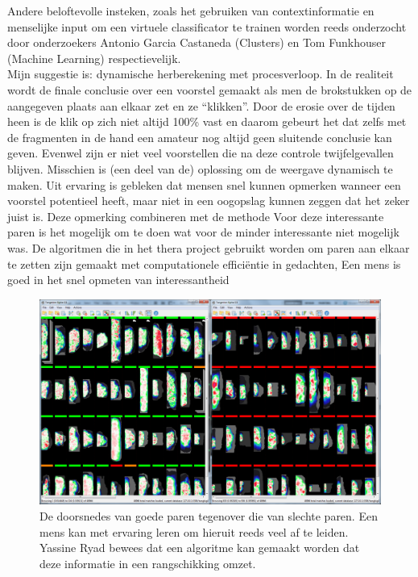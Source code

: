 Andere beloftevolle insteken, zoals het gebruiken van contextinformatie en menselijke input om een virtuele classificator te trainen worden reeds onderzocht door onderzoekers Antonio Garcia Castaneda (Clusters) en Tom Funkhouser (Machine Learning) respectievelijk.\\

Mijn suggestie is: dynamische herberekening met procesverloop. In de realiteit wordt de finale conclusie over een voorstel gemaakt als men de brokstukken op de aangegeven plaats aan elkaar zet en ze ``klikken''. Door de erosie over de tijden heen is de klik op zich niet altijd 100\% vast en daarom gebeurt het dat zelfs met de fragmenten in de hand een amateur nog altijd geen sluitende conclusie kan geven. Evenwel zijn er niet veel voorstellen die na deze controle twijfelgevallen blijven. Misschien is (een deel van de) oplossing om de weergave dynamisch te maken. Uit ervaring is gebleken dat mensen snel kunnen opmerken wanneer een voorstel potentieel heeft, maar niet in een oogopslag kunnen zeggen dat het zeker juist is. Deze opmerking combineren met de methode Voor deze interessante paren is het mogelijk om te doen wat voor de minder interessante niet mogelijk was. 
 De algoritmen die in het thera project gebruikt worden om paren aan elkaar te zetten zijn gemaakt met computationele effici\"entie in gedachten,
Een mens is goed in het snel opmeten van interessantheid

\begin{figure}[ht]
	\begin{center}
		\includegraphics[width=1.0\columnwidth]{images/tileview-reduced-compare-01.png}
		\caption{De doorsnedes van goede paren tegenover die van slechte paren. Een mens kan met ervaring leren om hieruit reeds veel af te leiden. Yassine Ryad bewees dat een algoritme kan gemaakt worden dat deze informatie in een rangschikking omzet.}
		\label{fig:tileview-reduced-compare}
	\end{center}
\end{figure}

